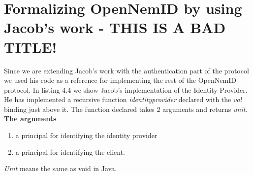 \documentclass[twosided]{report}
\begin{document}
\section{Formalizing OpenNemID by using Jacob's work - THIS IS A BAD TITLE!}
Since we are extending Jacob's work with the authentication part of the protocol we used his code as a reference for implementing the rest of the OpenNemID protocol. In listing 4.4 we show Jacob's implementation of the Identity Provider. He has implemented a recursive function \emph{identityprovider} declared with the \emph{val} binding just above it. The function declared takes 2 arguments and returns \emph{unit}.\\
\textbf{The arguments}
\begin{enumerate}
\item a principal for identifying the identity provider
\item a principal for identifying the client.
\end{enumerate}
\emph{Unit} means the same as void in Java.
\end{document}
